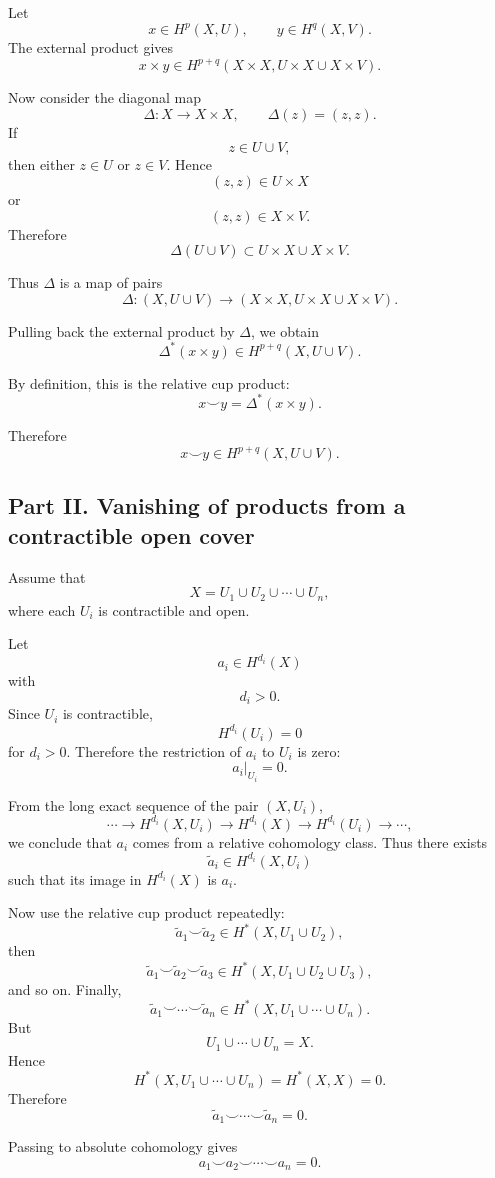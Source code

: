 \documentclass[12pt,a4paper]{article}
\theoremstyle{notespace}
\begin{document}
Let
\[
x\in H^p(X,U),
\qquad
y\in H^q(X,V).
\]
The external product gives
\[
x\times y
\in
H^{p+q}(X\times X, U\times X\cup X\times V).
\]

Now consider the diagonal map
\[
\Delta:X\to X\times X,
\qquad
\Delta(z)=(z,z).
\]
If
\[
z\in U\cup V,
\]
then either \(z\in U\) or \(z\in V\). Hence
\[
(z,z)\in U\times X
\]
or
\[
(z,z)\in X\times V.
\]
Therefore
\[
\Delta(U\cup V)
\subset
U\times X\cup X\times V.
\]

Thus \(\Delta\) is a map of pairs
\[
\Delta:
(X,U\cup V)
\longrightarrow
(X\times X, U\times X\cup X\times V).
\]

Pulling back the external product by \(\Delta\), we obtain
\[
\Delta^*(x\times y)
\in
H^{p+q}(X,U\cup V).
\]

By definition, this is the relative cup product:
\[
x\smile y
=
\Delta^*(x\times y).
\]

Therefore
\[
\boxed{
	x\smile y\in H^{p+q}(X,U\cup V).
}
\]

\subsection*{Part II. Vanishing of products from a contractible open cover}

Assume that
\[
X=U_1\cup U_2\cup \cdots \cup U_n,
\]
where each \(U_i\) is contractible and open.

Let
\[
a_i\in H^{d_i}(X)
\]
with
\[
d_i>0.
\]
Since \(U_i\) is contractible,
\[
H^{d_i}(U_i)=0
\]
for \(d_i>0\). Therefore the restriction of \(a_i\) to \(U_i\) is zero:
\[
a_i|_{U_i}=0.
\]

From the long exact sequence of the pair \((X,U_i)\),
\[
\cdots
\to
H^{d_i}(X,U_i)
\to
H^{d_i}(X)
\to
H^{d_i}(U_i)
\to
\cdots,
\]
we conclude that \(a_i\) comes from a relative cohomology class. Thus there exists
\[
\widetilde a_i\in H^{d_i}(X,U_i)
\]
such that its image in \(H^{d_i}(X)\) is \(a_i\).

Now use the relative cup product repeatedly:
\[
\widetilde a_1\smile \widetilde a_2
\in
H^*(X,U_1\cup U_2),
\]
then
\[
\widetilde a_1\smile \widetilde a_2\smile \widetilde a_3
\in
H^*(X,U_1\cup U_2\cup U_3),
\]
and so on. Finally,
\[
\widetilde a_1\smile \cdots \smile \widetilde a_n
\in
H^*(X,U_1\cup\cdots\cup U_n).
\]
But
\[
U_1\cup\cdots\cup U_n=X.
\]
Hence
\[
H^*(X,U_1\cup\cdots\cup U_n)
=
H^*(X,X)
=
0.
\]
Therefore
\[
\widetilde a_1\smile\cdots\smile \widetilde a_n=0.
\]

Passing to absolute cohomology gives
\[
a_1\smile a_2\smile \cdots \smile a_n=0.
\]
\end{document}
